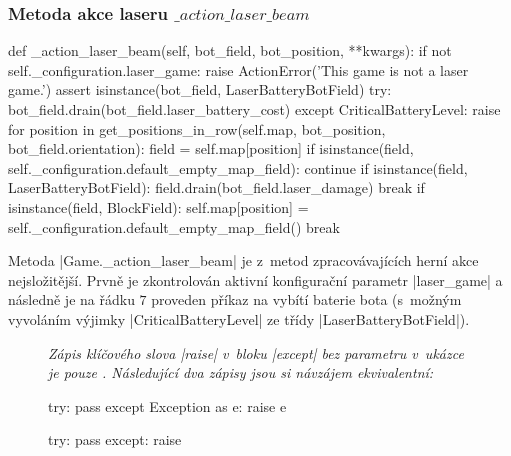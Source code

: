 {\subsubsection{Metoda akce laseru $\_action\_laser\_beam$}
\label{subsubsec:method-action-laser-beam}

\begin{code}[caption={Metoda $Game.\_action\_laser\_beam$},label={lst:game-action-laser-beam}]
def _action_laser_beam(self, bot_field, bot_position, **kwargs):
    if not self._configuration.laser_game:
        raise ActionError('This game is not a laser game.')
    assert isinstance(bot_field, LaserBatteryBotField)
    try:
        bot_field.drain(bot_field.laser_battery_cost)
    except CriticalBatteryLevel:
        raise
    for position in get_positions_in_row(self.map, bot_position, bot_field.orientation):
        field = self.map[position]
        if isinstance(field, self._configuration.default_empty_map_field):
            continue
        if isinstance(field, LaserBatteryBotField):
            field.drain(bot_field.laser_damage)
            break
        if isinstance(field, BlockField):
            self.map[position] = self._configuration.default_empty_map_field()
            break
\end{code}

\begin{sloppypar}
    Metoda \ic|Game._action_laser_beam| je z~metod zpracovávajících herní akce nejsložitější. Prvně je zkontrolován aktivní konfigurační parametr \ic|laser_game| a následně je na řádku $7$ proveden příkaz na vybítí baterie bota (s~možným vyvoláním výjimky \ic|CriticalBatteryLevel| ze třídy \ic|LaserBatteryBotField|).
\end{sloppypar}

\begin{figure}[!h]
    {\itshape
    Zápis klíčového slova \ic|raise| v~bloku \ic|except| bez parametru v~ukázce  je pouze \footnotemark. Následující dva zápisy jsou si návzájem ekvivalentní:}

    \begin{minipage}[b][9ex]{.47\textwidth}
    \begin{code}
try:
    pass
except Exception as e:
    raise e
    \end{code}
    \end{minipage}
    \hfill
    \begin{minipage}[b][9ex]{.47\textwidth}
    
    \begin{code}
try:
    pass
except:
    raise
    \end{code}
    \end{minipage}
    

\end{figure}}
